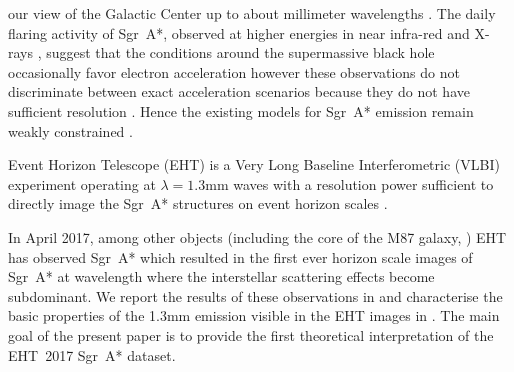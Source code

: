 our view of the Galactic Center up to about millimeter wavelengths \citep{2016ApJ...824...40O,2019A&A...621A.119B}. The daily flaring activity of Sgr~A*, observed at higher energies in near infra-red and X-rays \citep{2009ApJ...698..676D,2019ApJ...886...96H}, suggest that the conditions around the supermassive black hole occasionally favor electron acceleration however these observations do not discriminate between exact acceleration scenarios because they do not have sufficient resolution \citep{2000ApJ...541..234O}. Hence the existing models for Sgr~A* emission remain weakly constrained \citep[e.g.,][]{2005ApJ...621..785G,2006MNRAS.370..219M,
  2007A&A...474....1M, 2007MNRAS.379.1519M, 2009A&A...508L..13M,
  2009ApJ...701..521C, 2009ApJ...706..497M, 2012ApJ...746L..10D,
  2012MNRAS.421.1315Z, 2013A&A...559L...3M, 2014A&A...570A...7M,
  2014ApJ...790....1B, 2015ApJ...799....1C, 2015ApJ...802...69B,
  2015ApJ...812..103C, 2015Sci...350.1242J, 2016A&A...588A..57F,
  2016ApJ...826...77B, 2016ApJ...831....4P, 2016MNRAS.455.2187M,
  2017ApJ...837..180G, 2017ApJ...844...35M, 2017ApJ...851..148M,
  2017MNRAS.467.3604R, 2018A&A...612A..34D, 2018ApJ...856..163M,
  2018ApJ...859...60L, 2018ApJ...863..148P, 2018ApJ...865..104J,
  2018ApJ...868..101B, 2018JCAP...07..015H, 2018MNRAS.478.1875J,
  2018MNRAS.478.5209C, 2019ApJ...881L...2B, 2019ApJ...884..148B,
  2020ApJ...896L...6R, 2020ApJ...897...99T, 2020MNRAS.492.3272R,
  2020MNRAS.493.1404A, 2020MNRAS.494.4168D, 2020MNRAS.494.5923P,
  2020MNRAS.497.4999D, 2020ApJ...896L...6R, 2021ApJ...917....8B,
  2021MNRAS.502.2023P}.

Event Horizon Telescope (EHT) is a Very Long Baseline Interferometric (VLBI) experiment operating at $\lambda=1.3$mm waves with a resolution power sufficient to directly image the Sgr~A* structures on event horizon scales \citep{x}.

In April 2017, among other objects (including the core of the M87 galaxy, ) EHT has observed Sgr~A* which resulted in the first ever horizon scale images of Sgr~A* at wavelength where the interstellar scattering effects become subdominant. We report the results of these observations in  and characterise the basic properties of the 1.3mm emission visible in the EHT images in . The main goal of the present paper  is to provide the first theoretical interpretation of the EHT~2017 Sgr~A* dataset.

